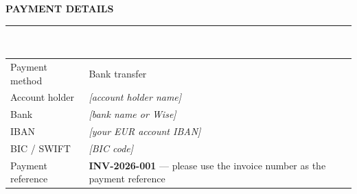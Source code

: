 \documentclass[10.5pt]{article}
\newcommand{\sectiontitle}[1]{%
  {\headingfont\bfseries\fontsize{9.5}{9.5}\selectfont\color{navy}\MakeUppercase{#1}}\\[1pt]
  {\color{gold}\rule{\linewidth}{0.9pt}}\\[7pt]
}
\newcommand{\lbl}[1]{{\color{slate}\footnotesize #1}}
\newcommand{\ph}[1]{{\color{slate}\itshape #1}}
\begin{document}
\vspace{0.4cm}

\sectiontitle{Payment details}
\begin{tabularx}{\linewidth}{@{}l X@{}}
  \lbl{Payment method} & Bank transfer \\[3pt]
  \lbl{Account holder} & \ph{[account holder name]} \\[3pt]
  \lbl{Bank} & \ph{[bank name or Wise]} \\[3pt]
  \lbl{IBAN} & \ph{[your EUR account IBAN]} \\[3pt]
  \lbl{BIC / SWIFT} & \ph{[BIC code]} \\[3pt]
  \lbl{Payment reference} & \textbf{INV-2026-001} --- please use the invoice number as the payment reference \\
\end{tabularx}

\vfill
{\color{slate}\footnotesize\centering\RaggedRight\ }
\end{document}
